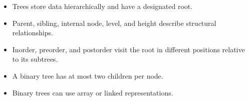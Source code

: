 \begin{chapterrecap}
\begin{itemize}
  \item Trees store data hierarchically and have a designated root.
  \item Parent, sibling, internal node, level, and height describe structural relationships.
  \item Inorder, preorder, and postorder visit the root in different positions relative to its subtrees.
  \item A binary tree has at most two children per node.
  \item Binary trees can use array or linked representations.
\end{itemize}
\end{chapterrecap}


